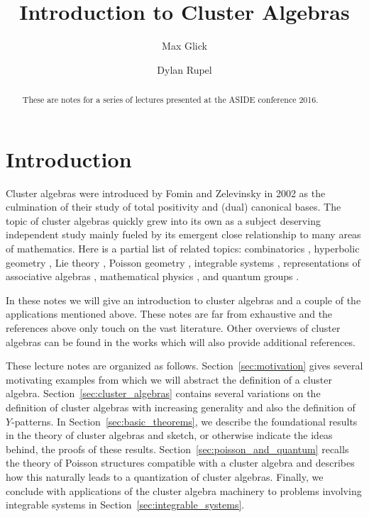 \documentclass{amsart}
\title{Introduction to Cluster Algebras}
\author{Max Glick}
\author{Dylan Rupel}
\theoremstyle{definition}
\theoremstyle{remark}
\numberwithin{equation}{section}
\begin{document}
\begin{abstract}
  These are notes for a series of lectures presented at the ASIDE conference 2016.
\end{abstract}
\maketitle

\section{Introduction}
  Cluster algebras were introduced by Fomin and Zelevinsky \cite{FZ02} in 2002 as the culmination of their study of total positivity \cite{FZ99} and (dual) canonical bases.  The topic of cluster algebras quickly grew into its own as a subject deserving independent study mainly fueled by its emergent close relationship to many areas of mathematics.  Here is a partial list of related topics: combinatorics \cite{MP07}, hyperbolic geometry \cite{FG06,FST08,MSW13}, Lie theory \cite{GLS06}, Poisson geometry \cite{GSV03}, integrable systems \cite{dFK10,G11}, representations of associative algebras \cite{CC06,CK06,BMRRT06,R11,Q12,R15}, mathematical physics \cite{EF12,ABCGPT14}, and quantum groups \cite{K12,GLS13,KQ14,BR15}.

  In these notes we will give an introduction to cluster algebras and a couple of the applications mentioned above.  These notes are far from exhaustive and the references above only touch on the vast literature.  Other overviews of cluster algebras can be found in the works \cite{K10,W13,GLS} which will also provide additional references.

  These lecture notes are organized as follows.  Section~\ref{sec:motivation} gives several motivating examples from which we will abstract the definition of a cluster algebra.  %
	Section~\ref{sec:cluster_algebras} contains several variations on the definition of cluster algebras with increasing generality and also the definition of $Y$-patterns.  In Section~\ref{sec:basic_theorems}, we describe the foundational results in the theory of cluster algebras and sketch, or otherwise indicate the ideas behind, the proofs of these results. Section~\ref{sec:poisson_and_quantum} recalls the theory of Poisson structures compatible with a cluster algebra and describes how this naturally leads to a quantization of cluster algebras.  Finally, we conclude with applications of the cluster algebra machinery to problems involving integrable systems in Section~\ref{sec:integrable_systems}.
\end{document}
